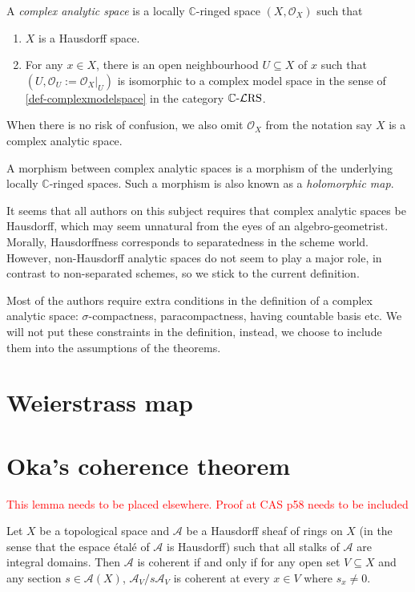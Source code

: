 \begin{definition}\label{def-complexanalyticspace}
    A \emph{complex analytic space} is a locally $\mathbb{C}$-ringed space $(X,\mathcal{O}_X)$ such that 
    \begin{enumerate}
        \item $X$ is a Hausdorff space.
        \item For any $x\in X$, there is an open neighbourhood $U\subseteq X$ of $x$ such that $(U,\mathcal{O}_U:=\mathcal{O}_X|_U)$ is isomorphic to a complex model space in the sense of \cref{def-complexmodelspace} in the category $\mathbb{C}\text{-}\mathcal{L}\mathrm{RS}$.
    \end{enumerate}
    When there is no risk of confusion, we also omit $\mathcal{O}_X$ from the notation say $X$ is a complex analytic space.

    A morphism between complex analytic spaces is a morphism of the underlying locally $\mathbb{C}$-ringed spaces. Such a morphism is also known as a \emph{holomorphic map}.
\end{definition}
\begin{remark}
    It seems that all authors on this subject requires that complex analytic spaces be Hausdorff, which may seem unnatural from the eyes of an algebro-geometrist. Morally, Hausdorffness corresponds to separatedness in the scheme world. However, non-Hausdorff analytic spaces do not seem to play a major role, in contrast to non-separated schemes, so we stick to the current definition.
\end{remark}
\begin{remark}
    Most of the authors require extra conditions in the definition of a complex analytic space: $\sigma$-compactness, paracompactness, having countable basis etc. We will not put these constraints in the definition, instead, we choose to include them into the assumptions of the theorems.
\end{remark}


\section{Weierstrass map}

\section{Oka's coherence theorem}

\textcolor{red}{This lemma needs to be placed elsewhere. Proof at CAS p58 needs to be included}
\begin{lemma}\label{lma-formalcoherencecriterion}
    Let $X$ be a topological space and $\mathcal{A}$ be a Hausdorff sheaf of rings on $X$ (in the sense that the espace étalé of $\mathcal{A}$ is Hausdorff) such that all stalks of $\mathcal{A}$ are integral domains. Then $\mathcal{A}$ is coherent if and only if for any open set $V\subseteq X$ and any section $s\in \mathcal{A}(X)$, $\mathcal{A}_V/s\mathcal{A}_V$ is coherent at every $x\in V$ where $s_x\neq 0$.
\end{lemma}

